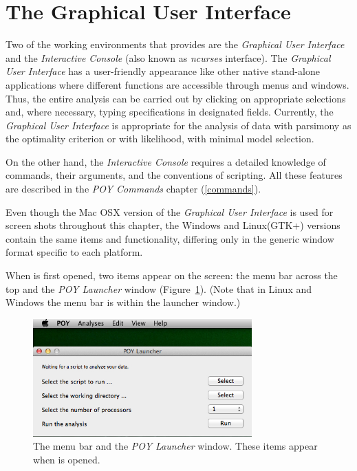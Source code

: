 \section{The Graphical User Interface}

Two of the working environments that \poy provides are the \emph{Graphical User Interface} and the 
\emph{Interactive Console} (also known as  \emph{ncurses} interface). The \emph{Graphical User 
Interface} has a user-friendly appearance like other native stand-alone applications where different 
functions are accessible through menus and windows. Thus, the entire analysis can be 
carried out by clicking on appropriate selections and, where necessary, typing specifications in 
designated fields. Currently, the \emph{Graphical User Interface} is appropriate for the analysis of 
data with parsimony as the  optimality criterion or with likelihood, with minimal model selection.  

On the other hand, the \emph{Interactive Console} requires a detailed knowledge of \poy commands, 
their arguments, and the conventions of \poy scripting. All these features are described in the 
\emph{POY Commands} chapter (\ref{commands}).

Even though the Mac OSX version of the \emph{Graphical User Interface} is used for screen 
shots throughout this chapter, the Windows and Linux(GTK+) versions contain the same items and 
functionality, differing only in the generic window format specific to each platform.

When \poy is first opened, two items appear on the screen: the \poy menu bar across the top and the 
\emph{POY Launcher} window (Figure~\ref{fig:menu_launcher_window}). (Note that in Linux and 
Windows the menu bar is within the launcher window.)

\begin{figure}[htpb]
    \begin{center}
        \includegraphics[width=0.75\textwidth]{doc/figures/menu_launcher_window.jpg}
    \end{center}
    \caption{The \poy menu bar and the \emph{POY Launcher} window. These items appear when \poy is opened.}
    \label{fig:menu_launcher_window}
\end{figure}

